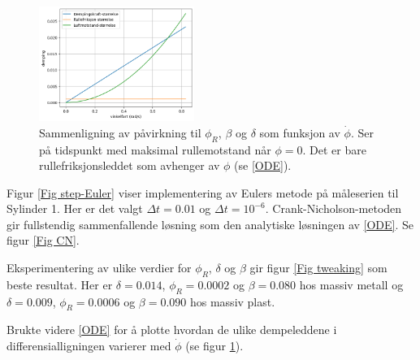\documentclass[5p]{elsarticle}
\begin{document}
\begin{figure}[p] 
	\begin{center}
            \includegraphics[width=0.45\textwidth]{img/comparison_d_b_r.png}
    \end{center}
	\caption{Sammenligning av påvirkning til \(\phi_R\), \(\beta\) og \(\delta\) som funksjon av \(\dot{\phi}\). Ser på tidspunkt med maksimal rullemotstand når \(\phi = 0\). Det er bare rullefriksjonsleddet som avhenger av \(\phi\) (se \eqref{ODE}).}
	\label{Fig comparison} %
\end{figure}

Figur \ref{Fig step-Euler} viser implementering av Eulers metode på måle\-serien til Sylinder 1. Her er det valgt \(\Delta t = 0.01\) og \(\Delta t = 10^{-6}\). 
Crank-Nicholson-metoden gir fullstendig sammenfallende løsning som den analytiske løsningen av \eqref{ODE}. Se figur \ref{Fig CN}.

Eksperimentering av ulike verdier for \(\phi_R\), \(\delta\) og \(\beta\) gir figur \ref{Fig tweaking} som beste resultat. Her er \(\delta = 0.014\), \(\phi_R = 0.0002\) og \(\beta = 0.080\) hos massiv metall og \(\delta = 0.009\), \(\phi_R = 0.0006\) og \(\beta = 0.090\) hos massiv plast.
\par
Brukte videre \eqref{ODE} for å plotte hvordan de ulike dempeleddene i differensialligningen varierer med \(\dot{\phi}\) (se figur \ref{Fig comparison}).
\end{document}
